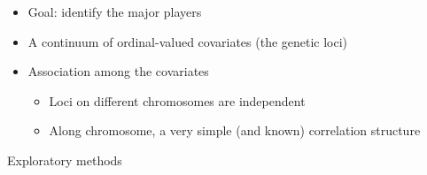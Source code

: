 \documentclass[12pt]{article}
\newcommand{\headsize}{\fontsize{35}{35} \selectfont}
\newcommand{\smallersize}{\fontsize{20}{25} \selectfont}
\newcommand{\smallestsize}{\fontsize{18}{22} \selectfont}
\begin{document}
\vspace{3cm} \color{mywhite} \smallersize

\hfill \begin{minipage}{10in}
\begin{itemize}
\itemsep24pt

\item Goal: identify the major players

\item A continuum of ordinal-valued covariates (the genetic loci)

\item Association among the covariates
{\color{myblue} \smallestsize
\begin{itemize}
\item Loci on different chromosomes are independent
\item Along chromosome, a very simple (and known) correlation
  structure
\end{itemize} }

\end{itemize}
\end{minipage}





\newpage

\headsize \color{myyellow}
\hfill \begin{minipage}{5.75in}
\centering
Exploratory methods
\end{minipage}

\vspace{3cm} \color{mywhite} \smallersize
\end{document}
